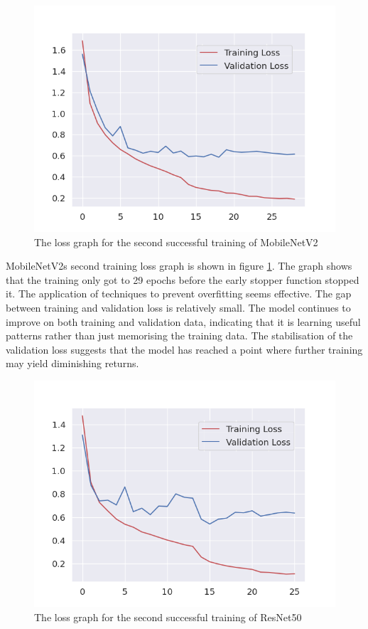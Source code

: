\begin{figure}[H]
    \centering{}
    \includegraphics[scale=0.5]{fed_images/train_loss_MobileNetv2_ofp.png}
    \caption{The loss graph for the second successful training of MobileNetV2}
    \label{figure:loss_mnv2_ofp}
\end{figure}

MobileNetV2s second training loss graph is shown in figure \ref{figure:loss_mnv2_ofp}. The graph shows that the training only got to 29 epochs before the early stopper function stopped it. The application of techniques to prevent overfitting seems effective. The gap between training and validation loss is relatively small. The model continues to improve on both training and validation data, indicating that it is learning useful patterns rather than just memorising the training data. The stabilisation of the validation loss suggests that the model has reached a point where further training may yield diminishing returns.

\begin{figure}[H]
    \centering{}
    \includegraphics[scale=0.5]{fed_images/train_loss_ResNet50_ofp.png}
    \caption{The loss graph for the second successful training of ResNet50}
    \label{figure:loss_rn50_ofp}
\end{figure}

